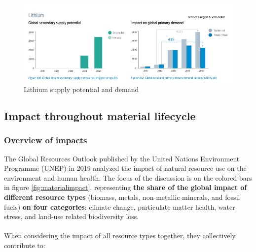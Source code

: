 \documentclass[../summary.tex]{subfiles}
\begin{document}
\begin{figure}[H]
	\centering
	\includegraphics[width=1\linewidth]{../images/Lithium_supply_potential_and_demand}
	\caption{Lithium supply potential and demand}
	\label{fig:lithiumsupplypotentialanddemand}
\end{figure}
\newpage
\subsection{Impact throughout material lifecycle}
\subsubsection{Overview of impacts}

The Global Resources Outlook published by the United Nations Environment Programme (UNEP) in 2019 analyzed the impact of natural resource use on the environment and human health. The focus of the discussion is on the colored bars in figure \ref{fig:materialimpact}, representing \textbf{the share of the global impact of different resource types} (biomass, metals, non-metallic minerals, and fossil fuels) \textbf{on four categories}: climate change, particulate matter health, water stress, and land-use related biodiversity loss.\\
\\
When considering the impact of all resource types together, they collectively contribute to:
\end{document}
